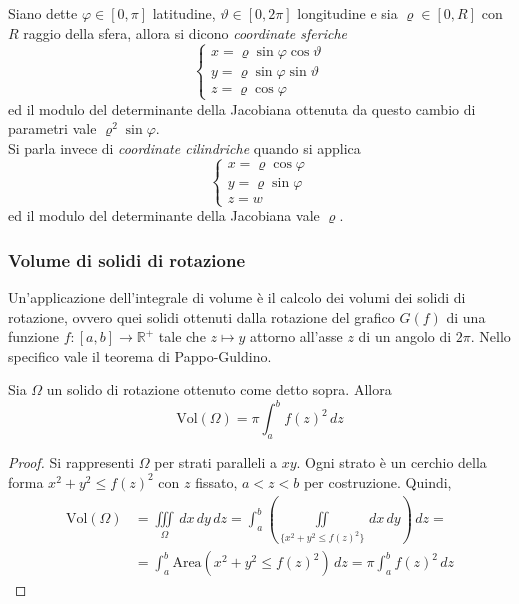 Siano dette $\varphi \in [0, \pi]$ latitudine, $\vartheta \in [0, 2\pi]$ longitudine e sia $\varrho \in [0, R]$ con $R$ raggio della sfera, allora si dicono \textit{coordinate sferiche}
\begin{equation*}
    \begin{cases}
    x=\varrho \sin \varphi \cos \vartheta\\
    y=\varrho \sin \varphi \sin \vartheta\\
    z=\varrho \cos \varphi
    \end{cases}
\end{equation*}
ed il modulo del determinante della Jacobiana ottenuta da questo cambio di parametri vale $\varrho^2 \sin \varphi$.\\
Si parla invece di \textit{coordinate cilindriche} quando si applica
\begin{equation*}
    \begin{cases}
        x=\varrho \cos \varphi\\
        y=\varrho \sin \varphi\\
        z=w
    \end{cases}
\end{equation*}
ed il modulo del determinante della Jacobiana vale $\varrho$.
\subsubsection{Volume di solidi di rotazione}
Un'applicazione dell'integrale di volume è il calcolo dei volumi dei solidi di rotazione, ovvero quei solidi ottenuti dalla rotazione del grafico $G(f)$ di una funzione $f:[a,b] \to \mathbb{R}^+$ tale che $z \mapsto y$ attorno all'asse $z$ di un angolo di $2\pi$. Nello specifico vale il teorema di Pappo-Guldino.
\begin{theorem}
Sia $\Omega$ un solido di rotazione ottenuto come detto sopra. Allora
\begin{equation*}
    \text{Vol}(\Omega)= \pi \int_a^b{f(z)^2}\, dz
\end{equation*}
\end{theorem}
\begin{proof}
    Si rappresenti $\Omega$ per strati paralleli a $xy$. Ogni strato è un cerchio della forma $x^2+y^2 \leq f(z)^2$ con $z$ fissato, $a<z<b$ per costruzione.
    Quindi, 
    \begin{equation*}
    \begin{aligned}
        \text{Vol}(\Omega)&= \iiint\limits_{\Omega}\,dx\,dy\,dz=\int_a^b{\left(\iint\limits_{\{x^2+y^2 \leq f(z)^2\}}{\,dx\,dy}\right)}\,dz=\\
        &= \int_{a}^{b}{\text{Area}(x^2+y^2 \leq f(z)^2)}\,dz = \pi\int_a^b{f(z)^2}\,dz
    \end{aligned}
    \end{equation*}
\end{proof}
